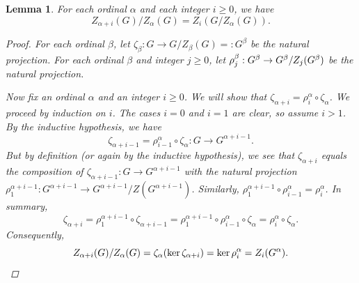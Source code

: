 \documentclass[twoside,a4paper,reqno,11pt]{amsart}
\newtheorem{lemma}[theorem]{Lemma}
\theoremstyle{definition}
\begin{document}
\begin{lemma}\label{simpleobservation} For each ordinal $\alpha$ and each integer $i\geq 0$, we have $$Z_{\alpha+i}(G)/Z_\alpha(G)=Z_i(G/Z_\alpha(G)).$$
\begin{proof} For each ordinal $\beta$, let $\zeta_\beta:G\to G/Z_\beta(G)=:G^\beta$ be the natural projection. For each ordinal $\beta$ and integer $j\geq 0$, let $\smash{\rho^\beta_j}:G^\beta\to G^\beta/Z_j(G^\beta)$ be the natural projection.

\vspace{2mm}\noindent Now fix an ordinal $\alpha$ and an integer $i\geq 0$. We will show that $\zeta_{\alpha+i}=\rho^\alpha_i\circ\zeta_\alpha$. We proceed by induction on $i$. The cases $i=0$ and $i=1$ are clear, so assume $i>1$. By the inductive hypothesis, we have $$\zeta_{\alpha+i-1}=\rho^\alpha_{i-1}\circ\zeta_\alpha:G\to G^{\alpha+i-1}.$$ But by definition (or again by the inductive hypothesis), we see that $\zeta_{\alpha+i}$ equals the composition of $\zeta_{\alpha+i-1}:G\to G^{\alpha+i-1}$ with the natural projection $\rho^{\alpha+i-1}_1:G^{\alpha+i-1}\to G^{\alpha+i-1}/Z(G^{\alpha+i-1})$. Similarly, $\rho^{\alpha+i-1}_1\circ\rho^\alpha_{i-1}=\rho^\alpha_i$. In summary, $$\zeta_{\alpha+i}=\rho^{\alpha+i-1}_1\circ\zeta_{\alpha+i-1}=\rho^{\alpha+i-1}_1\circ\rho^\alpha_{i-1}\circ \zeta_\alpha=\rho^\alpha_i\circ\zeta_\alpha.$$ Consequently, $$Z_{\alpha+i}(G)/Z_\alpha(G)=\zeta_\alpha(\ker\zeta_{\alpha+i})=\ker\rho^\alpha_i=Z_i(G^\alpha). \qedhere$$ %
\end{proof}
\end{lemma} 
\end{document}

